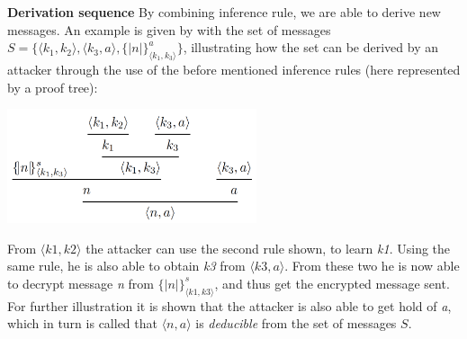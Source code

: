 \noindent \textbf{Derivation sequence}  \qquad
By combining inference rule, we are able to derive new messages. An example is given by \citeauthor{DBLP:journals/ftpl/CortierK14} with the set of messages $S = \{\langle k_1, k_2\rangle ,\langle k_3, a\rangle , \{|n|\}^a_{\langle k_1, k_3\rangle}\}$, illustrating how the set can be derived by an attacker through the use of the before mentioned inference rules (here represented by a proof tree):
\begin{center}
\includegraphics[width=0.55\textwidth, angle=0]{Graphics/Proof_tree.pdf}
\end{center}
From $\langle k1, k2\rangle$ the attacker can use the second rule shown, to learn \textit{k1}. Using the same rule, he is also able to obtain \textit{k3} from $\langle k3, a\rangle$. From these two he is now able to decrypt message \textit{n} from $\{|n|\}^s_{\langle k1, k3\rangle}$, and thus get the encrypted message sent. For further illustration it is shown that the attacker is also able to get hold of \textit{a}, which in turn is called that $\langle n, a\rangle$ is \textit{deducible} from the set of messages $S$. \\ \\




